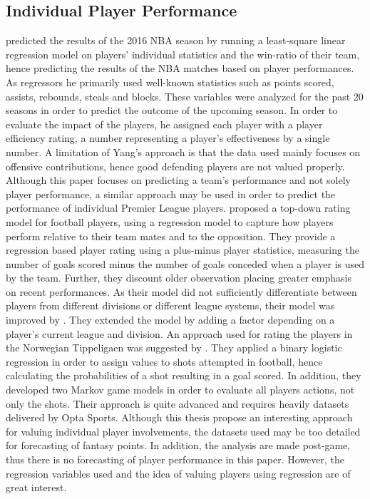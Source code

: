 \subsection{Individual Player Performance} \label{Forecasting_of_player_performance}
\cite{Yang} predicted the results of the 2016 NBA season by running a least-square linear regression model on players’ individual statistics and the win-ratio of their team, hence predicting the results of the NBA matches based on player performances. As regressors he primarily used well-known statistics such as points scored, assists, rebounds, steals and blocks. These variables were analyzed for the past 20 seasons in order to predict the outcome of the upcoming season. In order to evaluate the impact of the players, he assigned each player with a player efficiency rating, a number representing a player’s effectiveness by a single number. A limitation of Yang’s approach is that the data used mainly focuses on offensive contributions, hence good defending players are not valued properly. Although this paper focuses on predicting a team’s performance and not solely player performance, a similar approach may be used in order to predict the performance of individual Premier League players. 
\newpar
\cite{Hvattum_2015} proposed a top-down rating model for football players, using a regression model to capture how players perform relative to their team mates and to the opposition. They provide a regression based player rating using  a plus-minus player statistics, measuring the number of goals scored minus the number of goals conceded when a player is used by the team. Further, they discount older observation placing greater emphasis on recent performances. As their model did not sufficiently differentiate between players from different divisions or different league systems, their model was improved by \cite{Hvattum_2017}. They extended the model by adding a factor depending on a player's current league and division. 
\newpar
An approach used for rating the players in the Norwegian Tippeligaen was suggested by \citep{vabo}. They applied a binary logistic regression in order to assign values to shots attempted in football, hence calculating the probabilities of a shot resulting in a goal scored. In addition, they developed two Markov game models in order to evaluate all players actions, not only the shots. Their approach is quite advanced and requires heavily datasets delivered by Opta Sports. Although this thesis propose an interesting approach for valuing individual player involvements, the datasets used may be too detailed for forecasting of fantasy points. In addition, the analysis are made post-game, thus there is no forecasting of player performance in this paper. However, the regression variables used and the idea of valuing players using regression are of great interest.
